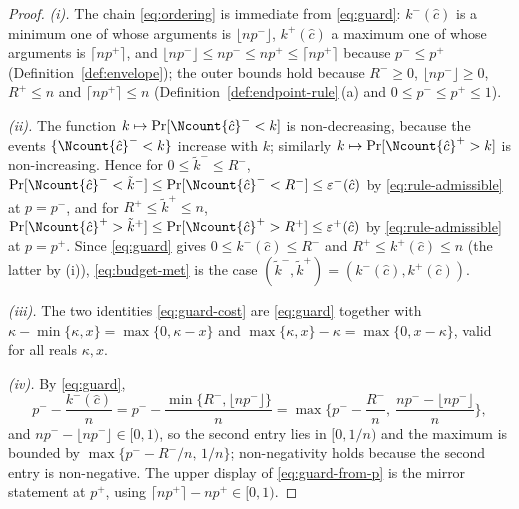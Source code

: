 \begin{proof}
\emph{(i).} The chain \eqref{eq:ordering} is immediate from \eqref{eq:guard}:
$k^{-}(\hat c)$ is a minimum one of whose arguments is $\lfloor np^{-}\rfloor$,
$k^{+}(\hat c)$ a maximum one of whose arguments is $\lceil np^{+}\rceil$, and
$\lfloor np^{-}\rfloor\le np^{-}\le np^{+}\le\lceil np^{+}\rceil$ because
$p^{-}\le p^{+}$ (Definition~\ref{def:envelope}); the outer bounds
hold because $R^{-}\ge0$, $\lfloor np^{-}\rfloor\ge0$, $R^{+}\le n$ and
$\lceil np^{+}\rceil\le n$ (Definition~\ref{def:endpoint-rule}\,(a) and
$0\le p^{-}\le p^{+}\le1$).

\emph{(ii).} The function $k\mapsto\Pr[\Ncount{\hat c}^{-}<k]$ is
non-decreasing, because the events $\{\Ncount{\hat c}^{-}<k\}$ increase with
$k$; similarly $k\mapsto\Pr[\Ncount{\hat c}^{+}>k]$ is non-increasing. Hence
for $0\le\tilde k^{-}\le R^{-}$,
$\Pr[\Ncount{\hat c}^{-}<\tilde k^{-}]\le\Pr[\Ncount{\hat c}^{-}<R^{-}]
\le\varepsilon^{-}(\hat c)$ by \eqref{eq:rule-admissible} at
$p=p^{-}$, and for $R^{+}\le\tilde k^{+}\le n$,
$\Pr[\Ncount{\hat c}^{+}>\tilde k^{+}]\le\Pr[\Ncount{\hat c}^{+}>R^{+}]
\le\varepsilon^{+}(\hat c)$ by \eqref{eq:rule-admissible} at $p=p^{+}$.
Since \eqref{eq:guard} gives $0\le k^{-}(\hat c)\le R^{-}$ and
$R^{+}\le k^{+}(\hat c)\le n$ (the latter by (i)), \eqref{eq:budget-met} is
the case $(\tilde k^{-},\tilde k^{+})=(k^{-}(\hat c),k^{+}(\hat c))$.

\emph{(iii).} The two identities \eqref{eq:guard-cost} are \eqref{eq:guard}
together with $\kappa-\min\{\kappa,x\}=\max\{0,\kappa-x\}$ and
$\max\{\kappa,x\}-\kappa=\max\{0,x-\kappa\}$, valid for all reals
$\kappa,x$.

\emph{(iv).} By \eqref{eq:guard},
\begin{equation*}
  p^{-}-\frac{k^{-}(\hat c)}{n}
  =p^{-}-\frac{\min\{R^{-},\lfloor np^{-}\rfloor\}}{n}
  =\max\Big\{p^{-}-\frac{R^{-}}{n},\
              \frac{np^{-}-\lfloor np^{-}\rfloor}{n}\Big\},
\end{equation*}
and $np^{-}-\lfloor np^{-}\rfloor\in[0,1)$, so the second entry lies in
$[0,1/n)$ and the maximum is bounded by $\max\{p^{-}-R^{-}/n,\,1/n\}$;
non-negativity holds because the second entry is non-negative. The upper
display of \eqref{eq:guard-from-p} is the mirror statement at $p^{+}$, using
$\lceil np^{+}\rceil-np^{+}\in[0,1)$.
\end{proof}
